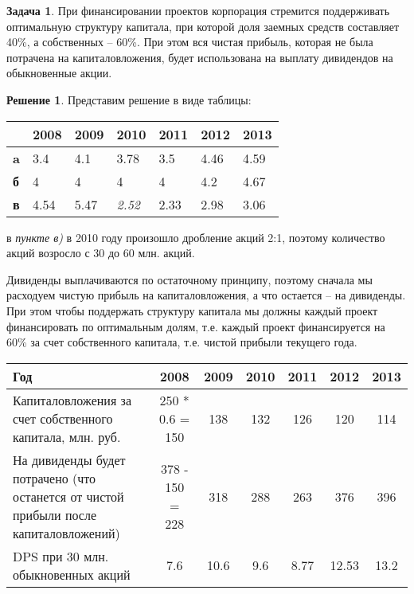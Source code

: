 \documentclass[a4paper, 14pt]{article}
\theoremstyle{plain} %
\theoremstyle{definition} %
\newtheorem*{solution}{Решение}
\newtheorem{problem}{Задача}[subsection]
\theoremstyle{remark} %
\begin{document}
\begin{problem}
	При  финансировании проектов корпорация стремится поддерживать оптимальную структуру капитала, при которой доля заемных средств составляет 40\%, а собственных – 60\%. При этом вся чистая прибыль, которая не была потрачена на капиталовложения, будет использована на выплату дивидендов на обыкновенные акции.
	\begin{solution}
		Представим решение в виде таблицы:
\begin{center}
\begin{tabular}{|l|l|l|l|l|l|l|}
\hline
           & \textbf{2008} & \textbf{2009} & \textbf{2010} & \textbf{2011} & \textbf{2012} & \textbf{2013}  \\
\hline
\textbf{a} & 3.4           & 4.1           & 3.78          & 3.5           & 4.46          & 4.59           \\
\hline
\textbf{б} & 4             & 4             & 4             & 4             & 4.2           & 4.67           \\
\hline
\textbf{в} & 4.54          & 5.47          & \textit{2.52} & 2.33          & 2.98          & 3.06           \\
\hline
\end{tabular}
\end{center}
в \emph{пункте в)} в 2010 году произошло дробление акций 2:1, поэтому количество акций возросло с 30 до 60 млн. акций.

Дивиденды выплачиваются по остаточному принципу, поэтому сначала мы расходуем чистую прибыль на капиталовложения, а что остается – на дивиденды. При этом чтобы поддержать структуру капитала мы должны каждый проект финансировать по оптимальным долям, т.е. каждый проект финансируется на 60\% за счет собственного капитала, т.е. чистой прибыли текущего года.

\begin{center}
	\begin{tabular}[0.88\textwidth]{|p{5.4cm}|c|c|c|c|c|c|}
	\hline
	\textbf{Год}                                                                          & \textbf{2008}   & \textbf{2009} & \textbf{2010} & \textbf{2011} & \textbf{2012} & \textbf{2013}  \\
	\hline
	Капиталовложения за счет собственного капитала, млн. руб.                             & 250 * 0.6 = 150 & 138           & 132           & 126           & 120           & 114            \\
	\hline
	На дивиденды будет потрачено (что останется от чистой прибыли после капиталовложений) & 378 - 150 = 228 & 318           & 288           & 263           & 376           & 396            \\
	\hline
	DPS при 30 млн. обыкновенных акций                                                    & 7.6             & 10.6          & 9.6           & 8.77          & 12.53         & 13.2           \\
	\hline
	\end{tabular}
\end{center}
	\end{solution}
\end{problem}
\end{document}
